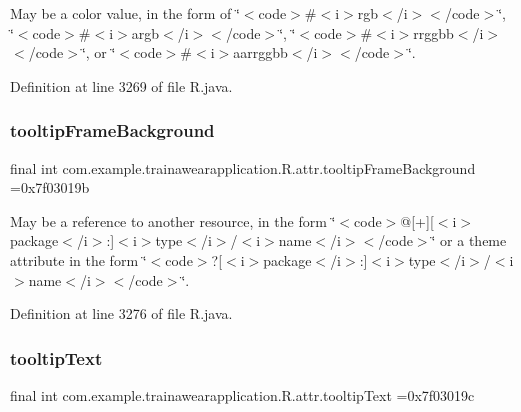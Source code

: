 May be a color value, in the form of \char`\"{}$<$code$>$\#$<$i$>$rgb$<$/i$>$$<$/code$>$\char`\"{}, \char`\"{}$<$code$>$\#$<$i$>$argb$<$/i$>$$<$/code$>$\char`\"{}, \char`\"{}$<$code$>$\#$<$i$>$rrggbb$<$/i$>$$<$/code$>$\char`\"{}, or \char`\"{}$<$code$>$\#$<$i$>$aarrggbb$<$/i$>$$<$/code$>$\char`\"{}. 

Definition at line 3269 of file R.\+java.

\mbox{\label{classcom_1_1example_1_1trainawearapplication_1_1_r_1_1attr_a7467e0d94f09788a22d5638bde77d239}} 
\subsubsection{\texorpdfstring{tooltipFrameBackground}{tooltipFrameBackground}}
{\footnotesize\ttfamily final int com.\+example.\+trainawearapplication.\+R.\+attr.\+tooltip\+Frame\+Background =0x7f03019b\hspace{0.3cm}{\ttfamily [static]}}

May be a reference to another resource, in the form \char`\"{}$<$code$>$@\mbox{[}+\mbox{]}\mbox{[}$<$i$>$package$<$/i$>$\+:\mbox{]}$<$i$>$type$<$/i$>$/$<$i$>$name$<$/i$>$$<$/code$>$\char`\"{} or a theme attribute in the form \char`\"{}$<$code$>$?\mbox{[}$<$i$>$package$<$/i$>$\+:\mbox{]}$<$i$>$type$<$/i$>$/$<$i$>$name$<$/i$>$$<$/code$>$\char`\"{}. 

Definition at line 3276 of file R.\+java.

\mbox{\label{classcom_1_1example_1_1trainawearapplication_1_1_r_1_1attr_ad8bb6c3bd7079cfe2544b0ae9e9f6b4b}} 
\subsubsection{\texorpdfstring{tooltipText}{tooltipText}}
{\footnotesize\ttfamily final int com.\+example.\+trainawearapplication.\+R.\+attr.\+tooltip\+Text =0x7f03019c\hspace{0.3cm}{\ttfamily [static]}}

